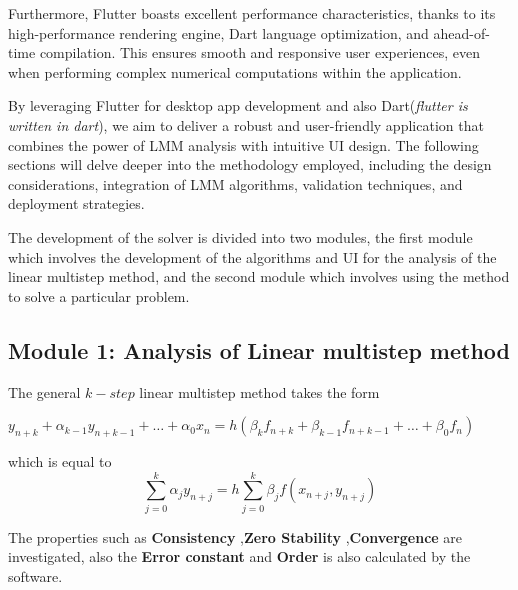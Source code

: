 Furthermore, Flutter boasts excellent performance characteristics, thanks to its high-performance rendering engine, Dart language optimization, and ahead-of-time compilation. This ensures smooth and responsive user experiences, even when performing complex numerical computations within the application.

By leveraging Flutter for desktop app development and also Dart(\textit{flutter is written in dart}), we aim to deliver a robust and user-friendly application that combines the power of LMM analysis with intuitive UI design. The following sections will delve deeper into the methodology employed, including the design considerations, integration of LMM algorithms, validation techniques, and deployment strategies.



The development of the solver is divided into two modules, the first module which involves the development of the algorithms and UI for the analysis of the linear multistep method, and the second module which involves using the method to solve a particular problem. 



\subsection{Module 1: Analysis of Linear multistep method}
The general $k-step$ linear multistep method takes the form 


\begin{math}
   y_{n+k} + \alpha_{k-1}y_{n+k-1}+ \dots + \alpha_0x_n = h(\beta_kf_{n+k}+ \beta_{k-1}f_{n+k-1}+ \dots + \beta_0f_n) 
\end{math}

which is equal to 
\begin{equation}
   \sum_{j=0}^{k} \alpha_j y_{n+j} = h \sum_{j=0}^{k} \beta_j f(x_{n+j}, y_{n+j})
\end{equation} \cite{2022JFatokunEtAl}

The properties such as \textbf{Consistency} ,\textbf{Zero Stability} ,\textbf{Convergence} are investigated, also the \textbf{Error constant} and \textbf{Order} is also calculated by the software.

